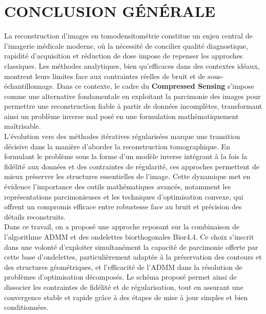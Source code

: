 \chapter*{CONCLUSION GÉNÉRALE}
La reconstruction d'images en tomodensitométrie constitue un enjeu central de l'imagerie médicale moderne, où la nécessité de concilier qualité diagnostique, rapidité d'acquisition et réduction de dose impose de repenser les approches classiques. Les méthodes analytiques, bien qu'efficaces dans des contextes idéaux, montrent leurs limites face aux contraintes réelles de bruit et de sous-échantillonnage. Dans ce contexte, le cadre du \textbf{Compressed Sensing} s'impose comme une alternative fondamentale en exploitant la parcimonie des images pour permettre une reconstruction fiable à partir de données incomplètes, transformant ainsi un problème inverse mal posé en une formulation mathématiquement maîtrisable.\\

L'évolution vers des méthodes itératives régularisées marque une transition décisive dans la manière d'aborder la reconstruction tomographique. En formulant le problème sous la forme d'un modèle inverse intégrant à la fois la fidélité aux données et des contraintes de régularité, ces approches permettent de mieux préserver les structures essentielles de l'image. Cette dynamique met en évidence l'importance des outils mathématiques avancés, notamment les représentations parcimonieuses et les techniques d'optimisation convexe, qui offrent un compromis efficace entre robustesse face au bruit et précision des détails reconstruits.\\

Dans ce travail, on a proposé une approche reposant sur la combinaison de l'algorithme ADMM et des ondelettes biorthogonales Bior4.4. Ce choix s'inscrit dans une volonté d'exploiter simultanément la capacité de parcimonie offerte par cette base d'ondelettes, particulièrement adaptée à la préservation des contours et des structures géométriques, et l'efficacité de l'ADMM dans la résolution de problèmes d'optimisation décomposés. Le schéma proposé permet ainsi de dissocier les contraintes de fidélité et de régularisation, tout en assurant une convergence stable et rapide grâce à des étapes de mise à jour simples et bien conditionnées.\\

